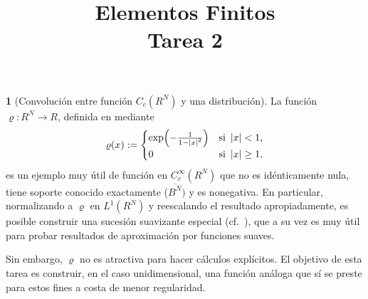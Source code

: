 \documentclass[10pt,a4paper]{report}
\title{\color{azul}\textbf{Elementos Finitos}\\
	\textbf{Tarea 2}}
\author{\color{azul}\autor}
\date{\color{azul}}
\newcommand{\abs}[2][y]{\if#1y\left\fi\lvert#2\if#1y\right\fi\rvert}
\newcommand{\Real}{R}
\theoremstyle{definition}
\newtheorem{problem}{\color{azul}{Problema}}
\numberwithin{equation}{problem}
\providecommand{\abs}[1]{\left\lvert#1\right\rvert}
\begin{document}
	\begin{problem}[Convolución entre función $C_c(\Real^N)$ y una distribución]
    La función $\varrho \colon R^N \to R$, definida en \cite[Lem.~2.4]{Tartar} mediante
    \begin{equation*}
    	\varrho(x) := \begin{cases}
    		\exp\mathopen{}\left(-\frac{1}{1-\abs{x}^2}\mathclose{}\right) & \text{si } \abs{x}<1,\\
    		0 & \text{si } \abs{x} \geq 1,
    	\end{cases}
    \end{equation*}
    es un ejemplo muy útil de función en $C^\infty_c(R^N)$ que no es idénticamente nula, tiene soporte conocido exactamente ($\overline{B^N})$ y es nonegativa.
    En particular, normalizando a $\varrho$ en $L^1(R^N)$ y reescalando el resultado apropiadamente, es posible construir una sucesión suavizante especial (cf.\ \cite[Def.~3.1]{Tartar}), que a su vez es muy útil para probar resultados de aproximación por funciones suaves.
    
    Sin embargo, $\varrho$ no es atractiva para hacer cálculos explícitos.
    El objetivo de esta tarea es construir, en el caso unidimensional, una función análoga que sí se preste para estos fines a costa de menor regularidad.
    

\end{problem}
\end{document}
